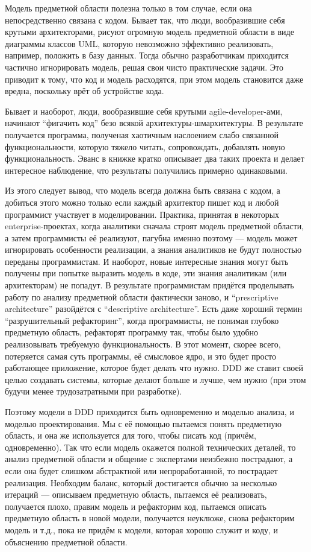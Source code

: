 \documentclass[a5paper]{article}
\begin{document}
Модель предметной области полезна только в том случае, если она непосредственно связана с кодом. Бывает так, что люди, вообразившие себя крутыми архитекторами, рисуют огромную модель предметной области в виде диаграммы классов UML, которую невозможно эффективно реализовать, например, положить в базу данных. Тогда обычно разработчикам приходится частично игнорировать модель, решая свои чисто практические задачи. Это приводит к тому, что код и модель расходятся, при этом модель становится даже вредна, поскольку врёт об устройстве кода.

Бывает и наоборот, люди, вообразившие себя крутыми agile-developer-ами, начинают ``фигачить код'' безо всякой архитектуры-шмархитектуры. В результате получается программа, полученая хаотичным наслоением слабо связанной функциональности, которую тяжело читать, сопровождать, добавлять новую функциональность. Эванс в книжке кратко описывает два таких проекта и делает интересное наблюдение, что результаты получились примерно одинаковыми.

Из этого следует вывод, что модель всегда должна быть связана с кодом, а добиться этого можно только если каждый архитектор пишет код и любой программист участвует в моделировании. Практика, принятая в некоторых enterprise-проектах, когда аналитики сначала строят модель предметной области, а затем программисты её реализуют, пагубна именно поэтому --- модель может игнорировать особенности реализации, а знания аналитиков не будут полностью переданы программистам. И наоборот, новые интересные знания могут быть получены при попытке выразить модель в коде, эти знания аналитикам (или архитекторам) не попадут. В результате программистам придётся проделывать работу по анализу предметной области фактически заново, и ``prescriptive architecture'' разойдётся с ``descriptive architecture''. Есть даже хороший термин ``разрушительный рефакторинг'', когда программисты, не понимая глубоко предметную область, рефакторят программу так, чтобы было удобно реализовывать требуемую функциональность. В этот момент, скорее всего, потеряется самая суть программы, её смысловое ядро, и это будет просто работающее приложение, которое будет делать что нужно. DDD же ставит своей целью создавать системы, которые делают больше и лучше, чем нужно (при этом будучи менее трудозатратными при разработке).

Поэтому модели в DDD приходится быть одновременно и моделью анализа, и моделью проектирования. Мы с её помощью пытаемся понять предметную область, и она же используется для того, чтобы писать код (причём, одновременно). Так что если модель окажется полной технических деталей, то анализ предметной области и общение с экспертами неизбежно пострадают, а если она будет слишком абстрактной или непроработанной, то пострадает реализация. Необходим баланс, который достигается обычно за несколько итераций --- описываем предметную область, пытаемся её реализовать, получается плохо, правим модель и рефакторим код, пытаемся описать предметную область в новой модели, получается неуклюже, снова рефакторим модель и т.д., пока не придём к модели, которая хорошо служит и коду, и объяснению предметной области. 
\end{document}
